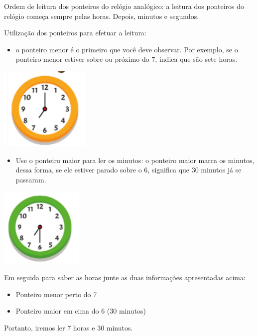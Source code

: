 \begin{escolha}
{Ordem de leitura dos ponteiros do relógio analógico: a leitura dos
ponteiros do relógio começa sempre pelas horas. Depois, minutos e
segundos.

Utilização dos ponteiros para efetuar a leitura:

\begin{itemize}
\item
  o ponteiro menor é o primeiro que você deve observar. Por exemplo, se
  o ponteiro menor estiver sobre ou próximo do 7, indica que são sete
  horas.
\end{itemize}

\includegraphics[width=1.69271in,height=1.56563in]{media/image49.png}

\begin{itemize}
\item
  Use o ponteiro maior para ler os minutos: o ponteiro maior marca os
  minutos, dessa forma, se ele estiver parado sobre o 6, significa que
  30 minutos já se passaram.
\end{itemize}

\includegraphics[width=1.57292in,height=1.50032in]{media/image50.png}

Em seguida para saber as horas junte as duas informações apresentadas
acima:

\begin{itemize}
\item
  Ponteiro menor perto do 7
\item
  Ponteiro maior em cima do 6 (30 minutos)
\end{itemize}

Portanto, iremos ler 7 horas e 30 minutos.}



\end{escolha}

